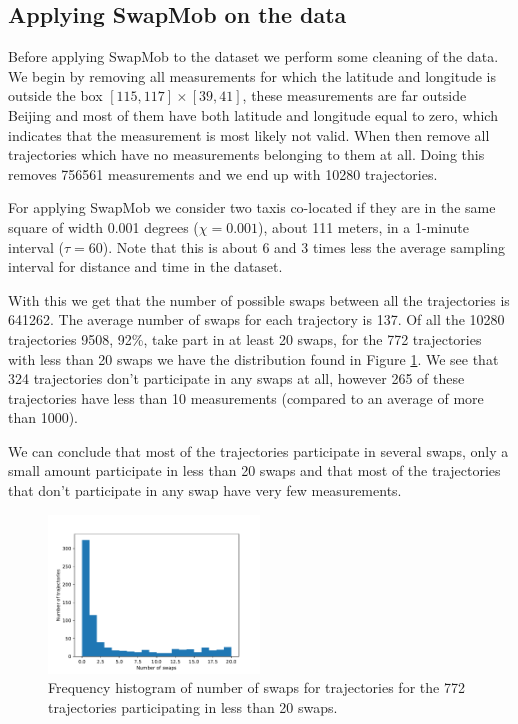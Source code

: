 \documentclass{llncs}
\begin{document}
\subsection{Applying SwapMob on the data}
Before applying SwapMob to the dataset we perform some cleaning of the
data. We begin by removing all measurements for which the latitude and
longitude is outside the box $[115, 117] \times [39, 41]$, these
measurements are far outside Beijing and most of them have both
latitude and longitude equal to zero, which indicates that the
measurement is most likely not valid. When then remove all
trajectories which have no measurements belonging to them at all.
Doing this removes 756561 measurements and we end up with 10280
trajectories.

For applying SwapMob we consider two taxis co-located if they are in
the same square of width 0.001 degrees ($\chi = 0.001$), about 111
meters, in a 1-minute interval ($\tau = 60$). Note that this is about
6 and 3 times less the average sampling interval for distance and time
in the dataset.

With this we get that the number of possible swaps between all the
trajectories is 641262. The average number of swaps for each
trajectory is 137. Of all the 10280 trajectories 9508, 92\%, take part
in at least 20 swaps, for the 772 trajectories with less than 20 swaps
we have the distribution found in Figure \ref{fig:swaps-distribution}.
We see that 324 trajectories don't participate in any swaps at all,
however 265 of these trajectories have less than 10 measurements
(compared to an average of more than 1000).

We can conclude that most of the trajectories participate in several
swaps, only a small amount participate in less than 20 swaps and that
most of the trajectories that don't participate in any swap have very
few measurements.

\begin{figure}
  \center
  \includegraphics[width=0.5\textwidth]{figures/swaps-distribution.pdf}
  \caption{Frequency histogram of number of swaps for trajectories for
    the 772 trajectories participating in less than 20 swaps.}
  \label{fig:swaps-distribution}
\end{figure}
\end{document}
